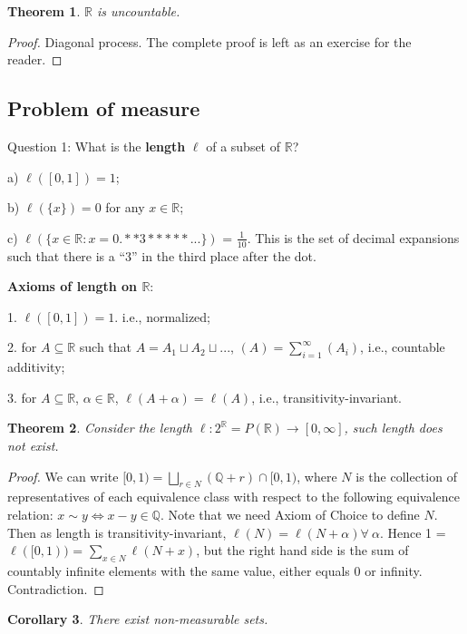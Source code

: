 \documentclass{article}
\newtheorem{theorem}{Theorem}[section]
\newtheorem{corollary}[theorem]{Corollary}
\theoremstyle{definition}
\begin{document}
\begin{theorem}
$\mathbb{R}$ is uncountable.
\end{theorem}
\begin{proof}
	Diagonal process. The complete proof is left as an exercise for the reader.
\end{proof}

\subsection{Problem of measure}

Question 1: What is the {\bf length} $\ell$ of a subset of $\mathbb{R}$?

a) $\ell([0,1]) = 1$;

b) $\ell(\{x\}) = 0$ for any $x \in \mathbb{R}$;

c) $\ell(\{x \in \mathbb{R}: x = 0.{*}{*}3{*}{*}{*}{*}{*}...\})$ = $\frac{1}{10}$.
This is the set of decimal expansions such that there is a ``3'' in the third place after the dot.

\vspace{3mm}

{\bf Axioms of length on $\mathbb{R}$}:

1. $\ell([0,1]) = 1$. i.e., normalized;

2. for $A \subseteq \mathbb{R}$ such that $A = A_1 \sqcup A_2 \sqcup ...$, $
(A) = \sum_{i=1}^{\infty} 
(A_i)$, i.e., countable additivity;

3. for $A \subseteq \mathbb{R}$, $\alpha \in \mathbb{R}$, $\ell(A+\alpha) = \ell(A)$, i.e., transitivity-invariant.

\begin{theorem}
Consider the length $\ell : 2^\mathbb{R} = P(\mathbb{R}) \longrightarrow [0,\infty]$, such length does not exist.
\end{theorem}
\begin{proof}
We can write $[0,1) = \bigsqcup_{r \in N}(\mathbb{Q}+r) \cap [0,1)$, where $N$ is the collection of representatives of each equivalence class with respect to the following equivalence relation: $x \sim y \Longleftrightarrow x-y \in \mathbb{Q}$. Note that we need Axiom of Choice to define $N$. Then as length is transitivity-invariant, $\ell(N) = \ell(N+\alpha) \forall\ \alpha$. Hence 1 = $\ell([0,1))$ = $\sum_{x \in N} \ell(N+x)$, but the right hand side is the sum of countably infinite elements with the same value, either equals 0 or infinity. Contradiction.
\end{proof}
\begin{corollary}
There exist non-measurable sets.
\end{corollary}
\end{document}
